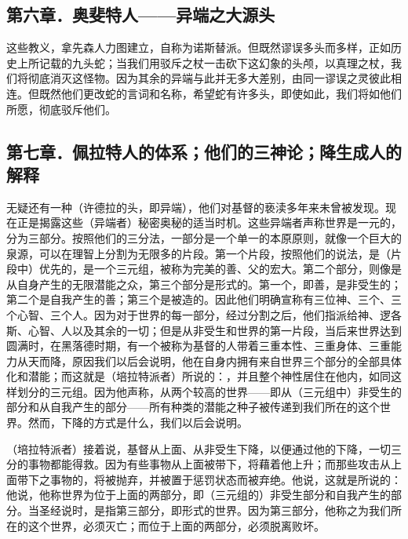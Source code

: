 \subsection{第六章．奥斐特人——异端之大源头}

这些教义，拿先森人力图建立，自称为诺斯替派。但既然谬误多头而多样，正如历史上所记载的九头蛇；当我们用驳斥之杖一击砍下这幻象的头颅，以真理之杖，我们将彻底消灭这怪物。因为其余的异端与此并无多大差别，由同一谬误之灵彼此相连。但既然他们更改蛇的言词和名称，希望蛇有许多头，即使如此，我们将如他们所愿，彻底驳斥他们。\par


\subsection{第七章．佩拉特人的体系；他们的三神论；降生成人的解释}

无疑还有一种（许德拉的头，即异端），他们对基督的亵渎多年来未曾被发现。现在正是揭露这些（异端者）秘密奥秘的适当时机。这些异端者声称世界是一元的，分为三部分。按照他们的三分法，一部分是一个单一的本原原则，就像一个巨大的泉源，可以在理智上分割为无限多的片段。第一个片段，按照他们的说法，是（片段中）优先的，是一个三元组，被称为完美的善、父的宏大。第二个部分，则像是从自身产生的无限潜能之众，第三个部分是形式的。第一个，即善，是非受生的；第二个是自我产生的善；第三个是被造的。因此他们明确宣称有三位神、三个、三个心智、三个人。因为对于世界的每一部分，经过分割之后，他们指派给神、逻各斯、心智、人以及其余的一切；但是从非受生和世界的第一片段，当后来世界达到圆满时，在黑落德时期，有一个被称为基督的人带着三重本性、三重身体、三重能力从天而降，原因我们以后会说明，他在自身内拥有来自世界三个部分的全部具体化和潜能；而这就是（培拉特派者）所说的：，并且整个神性居住在他内，如同这样划分的三元组。因为他声称，从两个较高的世界——即从（三元组中）非受生的部分和从自我产生的部分——所有种类的潜能之种子被传递到我们所在的这个世界。然而，下降的方式是什么，我们以后会说明。\par

（培拉特派者）接着说，基督从上面、从非受生下降，以便通过他的下降，一切三分的事物都能得救。因为有些事物从上面被带下，将藉着他上升；而那些攻击从上面带下之事物的，将被抛弃，并被置于惩罚状态而被弃绝。他说，这就是所说的：他说，他称世界为位于上面的两部分，即（三元组的）非受生部分和自我产生的部分。当圣经说时，是指第三部分，即形式的世界。因为第三部分，他称之为我们所在的这个世界，必须灭亡；而位于上面的两部分，必须脱离败坏。\par

